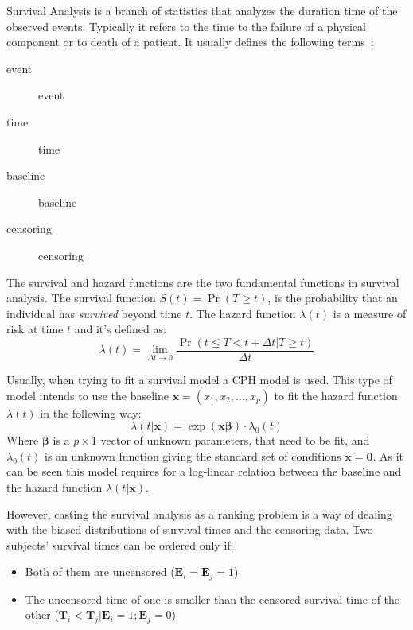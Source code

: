 \label{sec:survival}

Survival Analysis is a branch of statistics that analyzes the duration time of the observed
events. Typically it refers to the time to the failure of a physical component or to death of a
patient. It usually defines the following terms~\cite{neural:survival-analysis}:

\begin{description}
  \item[\Gls{event} ] \glsdesc*{event}
  \item[\Gls{time} ] \glsdesc*{time}
  \item[\Gls{baseline} ] \glsdesc*{baseline}
  \item[\Gls{censoring}] \glsdesc*{censoring}
\end{description}

The survival and hazard functions are the two fundamental functions in survival analysis. The
survival function \( S(t) = \Pr(T \ge t) \), is the probability that an individual has
\emph{survived} beyond time \( t \). The hazard function \( \lambda(t) \) is a measure of risk at 
time \( t \) and it's defined as:
~\cite{medical:cox}
\[
  \lambda(t) = \lim_{\Delta t \rightarrow 0}
  \frac{\Pr(t \le T < t + \Delta t | T \ge t)}{\Delta t}
\]

Usually, when trying to fit a survival model a \gls{CPH} model is used. This type of model
intends to use the \gls{baseline} \( \bm{x} = (x_1, x_2, ..., x_p) \)
to fit the hazard function \( \lambda(t) \)
in the following way:
\[
  \lambda(t | \bm{x}) = \exp(\bm{x}\bm{\beta}) \cdot \lambda_0 (t)
\]
Where \( \bm{\beta} \) is a \( p \times 1 \) vector of unknown parameters, that need to be fit, 
and \( \lambda_0(t) \) is an unknown function giving the standard set of conditions 
\( \bm{x} = \bm{0} \). As it can be seen this model requires for a log-linear relation between
the \gls{baseline}  and the hazard function \( \lambda(t | \bm{x}) \).

However, casting the survival analysis as a ranking problem is a way of dealing with the biased
distributions of survival times and the censoring data. Two subjects' survival times can be 
ordered only if:
\begin{itemize}
  \item Both of them are uncensored (\( \bm{E}_i = \bm{E}_j = 1\))
  \item The uncensored time of one is smaller than the censored survival time of the other
  (\( \bm{T}_i < \bm{T}_j | \bm{E}_i = 1; \bm{E}_j = 0 \))
\end{itemize}


